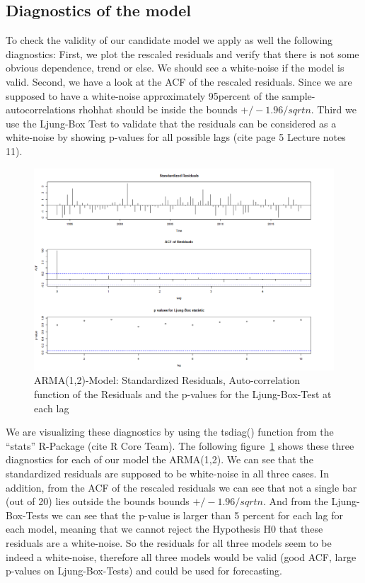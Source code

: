 \documentclass[11pt,a4paper]{article}
\begin{document}
\subsection{Diagnostics of the model}
To check the validity of our candidate model we apply as well the following diagnostics: First, we plot the rescaled residuals and verify that there is not some obvious dependence, trend or else. We should see a white-noise if the model is valid. Second, we have a look at the ACF of the rescaled residuals. Since we are supposed to have a white-noise approximately 95percent of the sample-autocorrelations rhohhat should be inside the bounds $+/-1.96/sqrt{n}$. Third we use the Ljung-Box Test \citep{LjungBox78} to validate that the residuals can be considered as a white-noise by showing p-values for all possible lags (cite page 5 Lecture notes 11). \\
\begin{figure}[!htb]
\centering
\includegraphics[angle=0,
height=0.73\textwidth]{tsdiag_arma_1_2}
\caption{ARMA(1,2)-Model: Standardized Residuals, Auto-correlation function of the Residuals and the p-values for the Ljung-Box-Test at each lag
\label{fig:tsdiag_arma_1_2}}
\end{figure}
We are visualizing these diagnostics by using the tsdiag() function from the “stats” R-Package (cite R Core Team). The following figure~\ref{fig:tsdiag_arma_1_2} shows these three diagnostics for each of our model the ARMA(1,2). We can see that the standardized residuals are supposed to be white-noise in all three cases. In addition, from the ACF of the rescaled residuals we can see that not a single bar (out of 20) lies outside the bounds bounds $+/-1.96/sqrt{n}$. And from the Ljung-Box-Tests we can see that the p-value is larger than 5 percent for each lag for each model, meaning that we cannot reject the Hypothesis H0 that these residuals are a white-noise. So the residuals for all three models seem to be indeed a white-noise, therefore all three models would be valid (good ACF, large p-values on Ljung-Box-Tests) and could be used for forecasting. \\
\end{document}
